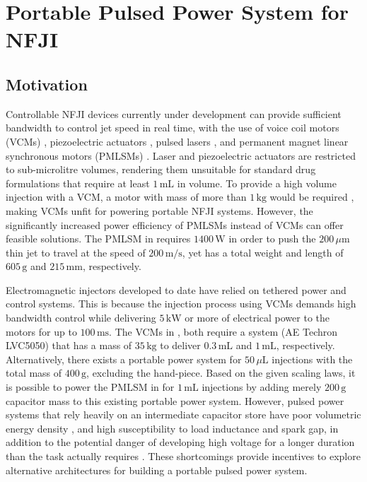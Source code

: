 \chapter{Portable Pulsed Power System for NFJI}

\section{Motivation}


    Controllable NFJI devices currently under development can provide sufficient bandwidth to control jet speed in real time, with the use of voice coil motors (VCMs) \cite{taberner2012}, piezoelectric actuators \cite{stachowiak2007}, pulsed lasers \cite{park2012}, and permanent magnet linear synchronous motors (PMLSMs) \cite{Do2017}. Laser and piezoelectric actuators are restricted to sub-microlitre volumes, rendering them unsuitable for standard drug formulations that require at least $1\,\mathrm{mL}$ in volume. To provide a high volume injection with a VCM, a motor with mass of more than $1\,\mathrm{kg}$ would be required \cite{ruddy2014}, making VCMs unfit for powering portable NFJI systems. However, the significantly increased power efficiency of PMLSMs instead of VCMs can offer feasible solutions. The PMLSM in \cite{Do2017} requires $1400\,\mathrm{W}$ in order to push the $200\,\mu\mathrm{m}$ thin jet to travel at the speed of $200\,\mathrm{m/s}$, yet has a total weight and length of $605\,\mathrm{g}$ and $215\,\mathrm{mm}$, respectively.
    
    Electromagnetic injectors developed to date have relied on tethered power and control systems. This is because the injection process using VCMs demands high bandwidth control while delivering $5\,\mathrm{kW}$ or more of electrical power to the motors for up to $100\,\mathrm{ms}$. The VCMs in \cite{taberner2012}, \cite{Mckeage2016} both require a system (AE Techron LVC5050) that has a mass of $35\,\mathrm{kg}$ to deliver $0.3\,\mathrm{mL}$ and $1\,\mathrm{mL}$, respectively. Alternatively, there exists a portable power system \cite{Ruddy2017} for $50\,\mu\mathrm{L}$ injections with the total mass of $400\,\mathrm{g}$, excluding the hand-piece. Based on the given scaling laws, it is possible to power the PMLSM in \cite{Do2017} for $1\,\mathrm{mL}$ injections by adding merely $200\,\mathrm{g}$ capacitor mass to this existing portable power system. However, pulsed power systems that rely heavily on an intermediate capacitor store have poor volumetric energy density \cite{Naoi2012}, and high susceptibility to load inductance and spark gap, in addition to the potential danger of developing high voltage for a longer duration than the task actually requires \cite{Jafari2015}. These shortcomings provide incentives to explore alternative architectures for building a portable pulsed power system.
    
